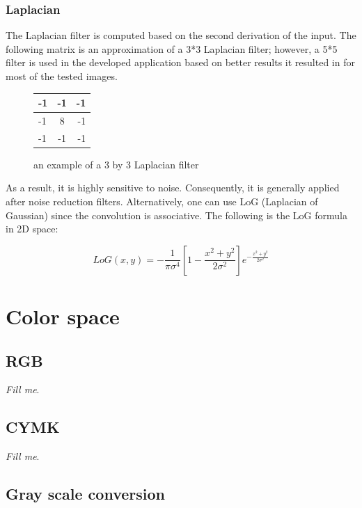 \documentclass{article}
\begin{document}
		\subsubsection{Laplacian}
			The Laplacian filter is computed based on the second derivation of the input. The following matrix is an approximation of a 3*3 Laplacian filter; however, a 5*5 filter is used in the developed application based on better results it resulted in for
most of the tested images.

\begin{figure}[H]
	\begin{center}
  \begin{tabular}{ | l | c | r | }
    \hline
    -1 & -1 & -1 \\ \hline
    -1 & 8 & -1 \\ \hline
    -1 & -1 & -1 \\
    \hline
  \end{tabular}
\end{center}
\caption{an example of a 3 by 3 Laplacian filter}\end{figure}


			 As a result, it is highly sensitive to noise. Consequently,
			it is generally applied after noise reduction filters. Alternatively, one can use LoG (Laplacian of Gaussian) since the convolution is
			associative. The following is the LoG formula in 2D space:

			\[LoG(x,y) = -\frac{1}{\pi\sigma^{4}}[1-\frac{x^{2}+y^{2}}{2\sigma^{2}}]e^{-\frac{x^{2}+y^{2}}{2\sigma^{2}}}\]

			

\section{Color space}          

	\subsection{RGB}
		
		\textit{Fill me}.

	\subsection{CYMK}

		\textit{Fill me}.

	\subsection{Gray scale conversion}
\end{document}
